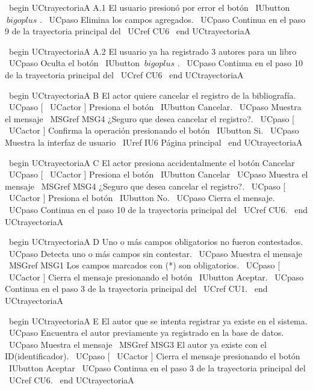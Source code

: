 \ begin {UCtrayectoriaA} {A.1} {El usuario presionó por error el botón \ IUbutton { $ \ bigoplus $ }.}
    \ UCpaso Elimina los campos agregados.
    \ UCpaso Continua en el paso 9 de la trayectoria principal del \ UCref {CU6}
\ end {UCtrayectoriaA}


\ begin {UCtrayectoriaA} {A.2} {El usuario ya ha registrado 3 autores para un libro}
	\ UCpaso Oculta el botón \ IUbutton { $ \ bigoplus $ }.
    \ UCpaso Continua en el paso 10 de la trayectoria principal del \ UCref {CU6}
\ end {UCtrayectoriaA}


\ begin {UCtrayectoriaA} {B} {El actor quiere cancelar el registro de la bibliografía.}
	\ UCpaso [ \ UCactor ] Presiona el botón \ IUbutton {Cancelar}.
    \ UCpaso Muestra el mensaje \ MSGref {MSG4} {¿Seguro que desea cancelar el registro?}.
    \ UCpaso [ \ UCactor ] Confirma la operación presionando el botón \ IUbutton {Si}.
    \ UCpaso Muestra la interfaz de usuario \ IUref {IU6} {Página principal}
\ end {UCtrayectoriaA}



\ begin {UCtrayectoriaA} {C} {El actor presiona accidentalmente el botón Cancelar}
	\ UCpaso [ \ UCactor ] Presiona el botón \ IUbutton {Cancelar}
    \ UCpaso Muestra el mensaje \ MSGref {MSG4} {¿Seguro que desea cancelar el registro?}.
    \ UCpaso [ \ UCactor ] Presiona el botón \ IUbutton {No}.
    \ UCpaso Cierra el mensaje.
    \ UCpaso Continua en el paso 10 de la trayectoria principal del \ UCref {CU6}.
\ end {UCtrayectoriaA}


\ begin {UCtrayectoriaA} {D} {Uno o más campos obligatorios no fueron contestados.}
	\ UCpaso Detecta uno o más campos sin contestar.
    \ UCpaso Muestra el mensaje \ MSGref {MSG1} {Los campos marcados con (*) son obligatorios}.
    \ UCpaso [ \ UCactor ] Cierra el mensaje presionando el botón \ IUbutton {Aceptar}.
    \ UCpaso Continua en el paso 3 de la trayectoria principal del \ UCref {CU1}.
\ end {UCtrayectoriaA}


\ begin {UCtrayectoriaA} {E} {El autor que se intenta registrar ya existe en el sistema.}
	\ UCpaso Encuentra el autor previamente ya registrado en la base de datos.
    \ UCpaso Muestra el mensaje \ MSGref {MSG3} {El autor ya existe con el ID(identificador).}
    \ UCpaso [ \ UCactor ] Cierra el mensaje presionando el botón \ IUbutton {Aceptar}
    \ UCpaso Continua en el paso 3 de la trayectoria principal del \ UCref {CU6}.
\ end {UCtrayectoriaA}